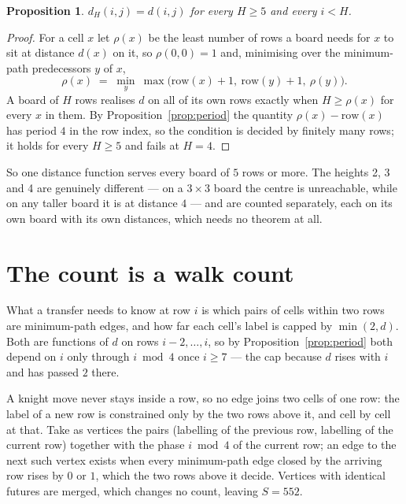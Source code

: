 \documentclass[11pt,a4paper]{article}
\theoremstyle{plain}
\newtheorem{proposition}[theorem]{Proposition}
\theoremstyle{definition}
\begin{document}
\begin{proposition}\label{prop:height}
$d_H(i,j)=d(i,j)$ for every $H\ge5$ and every $i<H$.
\end{proposition}

\begin{proof}
For a cell $x$ let $\rho(x)$ be the least number of rows a board needs for $x$ to sit at distance $d(x)$ on it, so $\rho(0,0)=1$ and, minimising over the minimum-path predecessors $y$ of $x$,
\[ \rho(x)\;=\;\min_y\ \max\bigl(\mathrm{row}(x)+1,\ \mathrm{row}(y)+1,\ \rho(y)\bigr). \]
A board of $H$ rows realises $d$ on all of its own rows exactly when $H\ge\rho(x)$ for every $x$ in them. By Proposition~\ref{prop:period} the quantity $\rho(x)-\mathrm{row}(x)$ has period $4$ in the row index, so the condition is decided by finitely many rows; it holds for every $H\ge5$ and fails at $H=4$.
\end{proof}

So one distance function serves every board of $5$ rows or more. The heights 2, 3 and 4 are genuinely different --- on a $3\times3$ board the centre is unreachable, while on any taller board it is at distance $4$ --- and are counted separately, each on its own board with its own distances, which needs no theorem at all.

\section{The count is a walk count}

What a transfer needs to know at row $i$ is which pairs of cells within two rows are minimum-path edges, and how far each cell's label is capped by $\min(2,d)$. Both are functions of $d$ on rows $i-2,\dots,i$, so by Proposition~\ref{prop:period} both depend on $i$ only through $i\bmod 4$ once $i\ge7$ --- the cap because $d$ rises with $i$ and has passed $2$ there.

A knight move never stays inside a row, so no edge joins two cells of one row: the label of a new row is constrained only by the two rows above it, and cell by cell at that. Take as vertices the pairs (labelling of the previous row, labelling of the current row) together with the phase $i\bmod 4$ of the current row; an edge to the next such vertex exists when every minimum-path edge closed by the arriving row rises by $0$ or $1$, which the two rows above it decide. Vertices with identical futures are merged, which changes no count, leaving $S=552$.
\end{document}
